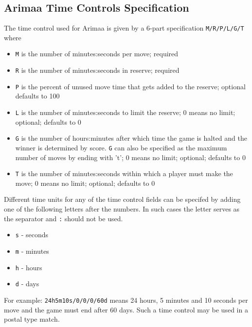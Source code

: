 \documentclass[10pt,dvipdfmx,letterpaper]{report}
\begin{document}
\subsection{Arimaa Time Controls Specification}
The time control used for Arimaa is given by a 6-part specification {\tt M/R/P/L/G/T} where
\begin{itemize}
\item {\tt M} is the number of minutes:seconds per move; required
\item {\tt R} is the number of minutes:seconds in reserve; required
\item {\tt P} is the percent of unused move time that gets
            added to the reserve; optional defaults to 100
\item {\tt L} is the number of minutes:seconds to limit the reserve;
            0 means no limit; optional; defaults to 0
\item {\tt G} is the number of hours:minutes after which time
            the game is halted and the winner is determined
            by score. {\tt G} can also be specified as the maximum
            number of moves by ending with 't'; 0 means no
            limit; optional; defaults to 0
\item {\tt T} is the number of minutes:seconds within which
            a player must make the move; 0 means no limit;
            optional; defaults to 0
\end{itemize}
Different time units for any of the time control fields
can be specifed by adding one of the following letters
after the numbers.  In such cases the letter serves as
the separator and {\tt :} should not be used.
\begin{itemize}
\item {\tt s} - seconds
\item {\tt m} - minutes
\item {\tt h} - hours
\item {\tt d} - days
\end{itemize}
For example:  {\tt 24h5m10s/0/0/0/60d} means 24 hours, 5 minutes
and 10 seconds per move and the game must end after 60 days.
Such a time control may be used in a postal type match.
\end{document}
